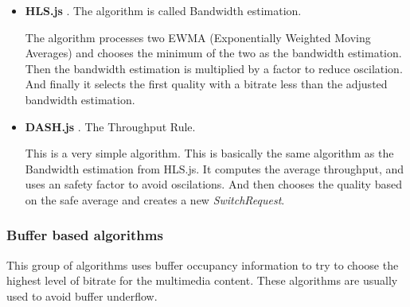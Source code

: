 \begin{itemize}
  \item \textbf{HLS.js} \cite{hls3}. The algorithm is called Bandwidth estimation. 
  
  The algorithm processes two EWMA (Exponentially Weighted Moving Averages) and chooses the minimum of the two 
  as the bandwidth estimation.
  Then the bandwidth estimation is multiplied by a factor to reduce oscilation. And finally it selects the 
  first quality with a bitrate less than the adjusted bandwidth estimation. 


  \item \textbf{DASH.js} \cite{dash3}. The Throughput Rule.
  
  This is a very simple algorithm. This is basically the same algorithm as the Bandwidth estimation from HLS.js.
  It computes the average throughput, and uses an safety factor to avoid oscilations. And then chooses the quality
  based on the safe average and creates a new \textit{SwitchRequest}.

  
\end{itemize}

\subsubsection{Buffer based algorithms}

This group of algorithms uses buffer occupancy information to try to choose the highest level of bitrate
for the multimedia content. These algorithms are usually used to avoid buffer underflow.

